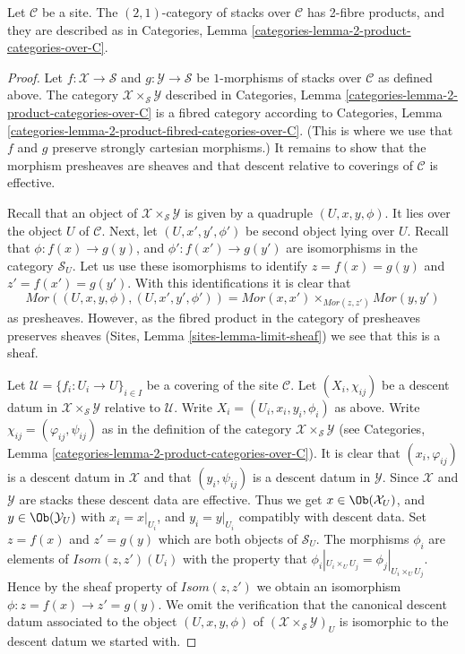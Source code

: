 \begin{lemma}
\label{lemma-2-product-stacks}
Let $\mathcal{C}$ be a site.
The $(2, 1)$-category of stacks over $\mathcal{C}$
has 2-fibre products, and they are described as in
Categories, Lemma \ref{categories-lemma-2-product-categories-over-C}.
\end{lemma}

\begin{proof}
Let $f : \mathcal{X} \to \mathcal{S}$ and
$g : \mathcal{Y} \to \mathcal{S}$ be
$1$-morphisms of stacks over $\mathcal{C}$
as defined above. The category
$\mathcal{X} \times_\mathcal{S} \mathcal{Y}$
described in
Categories, Lemma \ref{categories-lemma-2-product-categories-over-C} is a
fibred category according to
Categories, Lemma \ref{categories-lemma-2-product-fibred-categories-over-C}.
(This is where we use that $f$ and $g$ preserve strongly cartesian
morphisms.) It remains to show that the morphism presheaves are sheaves
and that descent relative to coverings of $\mathcal{C}$ is effective.

\medskip\noindent
Recall that an object of $\mathcal{X} \times_\mathcal{S} \mathcal{Y}$
is given by a quadruple $(U, x, y, \phi)$.
It lies over the object
$U$ of $\mathcal{C}$. Next, let $(U, x', y', \phi')$ be second
object lying over $U$.
Recall that $\phi : f(x) \to g(y)$, and $\phi' : f(x') \to g(y')$
are isomorphisms in the category $\mathcal{S}_U$. Let us
use these isomorphisms to identify $z = f(x) = g(y)$ and
$z' = f(x') = g(y')$. With this identifications
it is clear that
$$
\mathit{Mor}((U, x, y, \phi), (U, x', y', \phi'))
=
\mathit{Mor}(x, x')
\times_{\mathit{Mor}(z, z')}
\mathit{Mor}(y, y')
$$
as presheaves. However, as the fibred product in the category of
presheaves preserves sheaves (Sites, Lemma \ref{sites-lemma-limit-sheaf})
we see that this is a sheaf.

\medskip\noindent
Let $\mathcal{U} = \{f_i : U_i \to U\}_{i \in I}$ be a covering of the site
$\mathcal{C}$. Let $(X_i, \chi_{ij})$ be a descent datum
in $\mathcal{X} \times_\mathcal{S} \mathcal{Y}$ relative to $\mathcal{U}$.
Write $X_i = (U_i, x_i, y_i, \phi_i)$ as above. Write
$\chi_{ij} = (\varphi_{ij}, \psi_{ij})$ as in the definition of
the category $\mathcal{X} \times_\mathcal{S} \mathcal{Y}$ (see
Categories, Lemma \ref{categories-lemma-2-product-categories-over-C}).
It is clear that $(x_i, \varphi_{ij})$ is a descent datum in
$\mathcal{X}$ and that $(y_i, \psi_{ij})$ is a descent datum in
$\mathcal{Y}$. Since $\mathcal{X}$ and $\mathcal{Y}$ are stacks these
descent data are effective. Thus we get
$x \in \Ob(\mathcal{X}_U)$, and $y \in \Ob(\mathcal{Y}_U)$
with $x_i = x|_{U_i}$, and $y_i = y|_{U_i}$ compatibly with descent data.
Set $z = f(x)$ and $z' = g(y)$ which are both objects of $\mathcal{S}_U$.
The morphisms $\phi_i$ are elements of
$\mathit{Isom}(z, z')(U_i)$ with the property that
$\phi_i|_{U_i \times_U U_j} = \phi_j|_{U_i \times_U U_j}$.
Hence by the sheaf property of $\mathit{Isom}(z, z')$
we obtain an isomorphism $\phi : z = f(x) \to z' = g(y)$.
We omit the verification that the canonical descent datum associated to
the object $(U, x, y, \phi)$ of
$(\mathcal{X} \times_\mathcal{S} \mathcal{Y})_U$ is isomorphic
to the descent datum we started with.
\end{proof}

